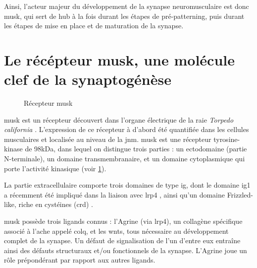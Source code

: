 	Ainsi, l'acteur majeur du développement de la synapse neuromusculaire est donc \gls{musk}, qui sert de hub à la fois durant les étapes de pré-patterning, puis durant les étapes de mise en place et de maturation de la synapse.
		
\section{Le récépteur \acrshort{musk}, une molécule clef de la synaptogénèse}
\label{sec:IntroMuSK}	

	\begin{figure}
		\caption{Récepteur \gls{musk}}
		\label{fig:RMuSK}
	\end{figure}
	
	\acrfull{musk} est un récepteur découvert dans l'organe électrique de la raie \emph{Torpedo california} \cite{Jennings1993}. L'expression de ce récepteur à d'abord été quantifiée dans les cellules musculaires et localisée au niveau de la \gls{jnm}. \gls{musk} est une récepteur tyrosine-kinase de 98kDa, dans lequel on distingue trois parties : un ectodomaine (partie N-terminale), un domaine transmembranaire, et un domaine cytoplasmique qui porte l'activité kinasique (voir \cref{fig:RMuSK}). 
	
	La partie extracellulaire comporte trois domaines de type \gls{ig}, dont le domaine \gls{ig}1 a récemment été impliqué dans la liaison avec \gls{lrp}4 \cite{Zhang2011}, ainsi qu'un domaine Frizzled-like, riche en cystéines (\gls{crd}) \cite{Jing2009}.
	
	\gls{musk} possède trois ligands connus : l'Agrine (via \acrshort{lrp}4), un collagène spécifique associé à l'\Gls{ache} appelé \acrshort{colq}, et les \Glspl{wnt}, tous nécessaire au développement complet de la synapse. Un défaut de signalisation de l'un d'entre eux entraîne ainsi des défauts structuraux et/ou fonctionnels de la synapse. L'Agrine joue un rôle prépondérant par rapport aux autres ligands.
	
